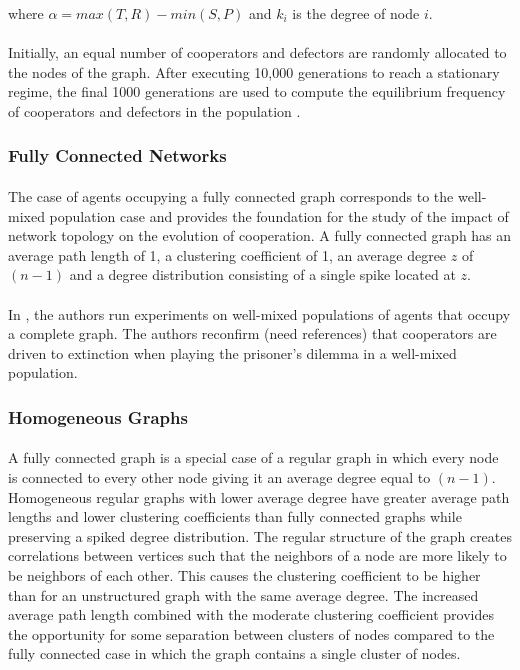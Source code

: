 \documentclass{article}
\begin{document}
    where $\alpha=max(T,R)-min(S,P)$ and $k_i$ is the degree of node $i$.

    \paragraph{}Initially, an equal number of cooperators and defectors are randomly allocated to the nodes of the graph.  After executing 10,000 generations to reach a stationary regime, the final 1000 generations are used to compute the equilibrium frequency of cooperators and defectors in the population \cite{Hauert2004}.

    \subsubsection{Fully Connected Networks}
    \paragraph{}The case of agents occupying a fully connected graph corresponds to the well-mixed population case and provides the foundation for the study of the impact of network topology on the evolution of cooperation.  A fully connected graph has an average path length of 1, a clustering coefficient of 1, an average degree $z$ of $(n-1)$ and a degree distribution consisting of a single spike located at $z$.
    \paragraph{} In \cite{Santos2006c}, the authors run experiments on well-mixed populations of agents that occupy a complete graph.  The authors reconfirm (need references) that cooperators are driven to extinction when playing the prisoner's dilemma in a well-mixed population.
    
    \subsubsection{Homogeneous Graphs}
    \paragraph{}A fully connected graph is a special case of a regular graph in which every node is connected to every other node giving it an average degree equal to $(n-1)$.   Homogeneous regular graphs with lower average degree have greater average path lengths and lower clustering coefficients than fully connected graphs while preserving a spiked degree distribution.  The regular structure of the graph creates correlations between vertices such that the neighbors of a node are more likely to be neighbors of each other.  This causes the clustering coefficient to be higher than for an unstructured graph with the same average degree.  The increased average path length combined with the moderate clustering coefficient provides the opportunity for some separation between clusters of nodes compared to the fully connected case in which the graph contains a single cluster of nodes.
\end{document}
